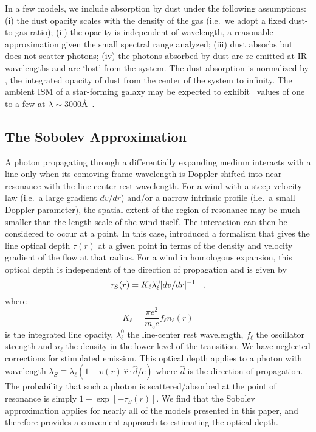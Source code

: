 \documentclass[12pt,preprint]{aastex}
\begin{document}
In a few models, we include absorption by dust under the following
assumptions:
(i) the dust opacity scales with the density of the gas (i.e.\ we
adopt a fixed dust-to-gas ratio);
(ii) the opacity is independent of wavelength, a reasonable
approximation given the small spectral range analyzed;
(iii) dust absorbs but does not scatter photons;
(iv) the photons absorbed by dust are re-emitted at IR wavelengths
and are `lost' from the system.  The dust absorption is normalized by \taud, 
the integrated opacity of dust from the center of the system to
infinity.  The ambient ISM of a star-forming galaxy may be expected to exhibit
\taud\ values of one to a few at $\lambda \sim 3000$\AA\ \citep[e.g.][]{cf00}.

\subsection{The Sobolev Approximation}

A photon propagating through a differentially expanding medium
interacts with a line only when
its comoving frame wavelength is Doppler-shifted into near resonance with the line center rest wavelength. 
For a wind with a steep velocity law  (i.e.\ a large gradient $dv/dr$)
and/or a narrow intrinsic profile (i.e.\ a small Doppler parameter), the 
spatial extent of the region of resonance
may be much smaller than the length scale of the
wind itself.  The interaction can then 
be considered to occur at  a point.
In this case, \citet{sobolev60} introduced a formalism that gives the line optical depth $\tau(r)$ at  
a given point in terms of the density and
velocity gradient of the flow at that radius.  For a wind in homologous expansion,
this optical depth is independent of the direction of propagation and
is given by
\begin{equation}
\tau_S(r) = K_\ell   \lambda^0_\ell | dv/dr |^{-1} \;\;\; ,
\label{eqn:Sobolev}
\end{equation}
where 
\begin{equation}
K_\ell = \frac{\pi e^2}{m_e c} f_\ell n_\ell(r)
\end{equation}
is the integrated line opacity, $\lambda^0_\ell$ the line-center rest wavelength,
$f_\ell$ the oscillator strength and
$n_\ell$ the density in the lower level of the transition.   We have
neglected corrections for stimulated emission.   This optical
depth applies to a photon with wavelength $\lambda_S
\equiv \lambda_\ell (1- v(r)~\hat{r}  \cdot \hat{d} /c)$ where $\hat{d}$ is the 
direction of propagation.  The probability that such a photon
is scattered/absorbed at the point of resonance is simply $1 - \exp[-\tau_S(r)]$.
We find that the Sobolev approximation applies for nearly all of the
models presented in this paper, and therefore provides a convenient
approach to estimating the optical depth.
\end{document}
